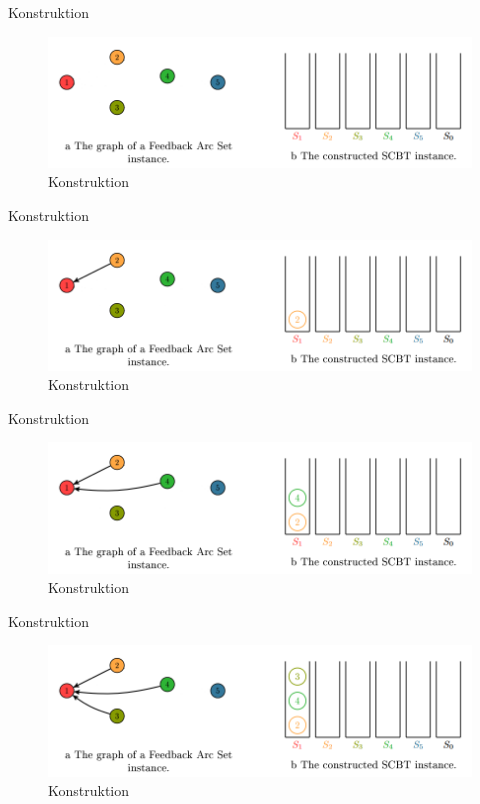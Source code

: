 \documentclass{beamer}
\begin{document}
\begin{frame}{Konstruktion}
\begin{figure}[ht]
		\includegraphics[width=\textwidth]{construct01}
		\caption{Konstruktion}
    \end{figure}
\end{frame}

\begin{frame}{Konstruktion}
\begin{figure}[ht]
		\includegraphics[width=\textwidth]{construct02}
		\caption{Konstruktion}
    \end{figure}
\end{frame}

\begin{frame}{Konstruktion}
\begin{figure}[ht]
		\includegraphics[width=\textwidth]{construct03}
		\caption{Konstruktion}
    \end{figure}
\end{frame}

\begin{frame}{Konstruktion}
\begin{figure}[ht]
		\includegraphics[width=\textwidth]{construct04}
		\caption{Konstruktion}
    \end{figure}
\end{frame}
\end{document}
